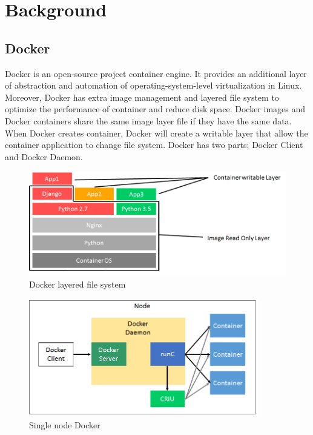 \chapter{Background}
\label{chap:background}
\section{Docker}
Docker is an open-source project container engine. It provides an additional layer of abstraction and automation of operating-system-level virtualization in Linux. Moreover, Docker has extra image management and layered file system to optimize the performance of container and reduce disk space. Docker images and Docker containers share the same image layer file if they have the same data. When Docker creates container, Docker will create a writable layer that allow the container application to change file system. Docker has two parts; Docker Client and Docker Daemon.

\begin{figure}[h]
\begin{center}
\includegraphics[width=15cm]{figure/layered_file_system.png}
\end{center}
\caption{Docker layered file system}
\label{fig:Docker layered file system}
\end{figure}

\begin{figure}[h]
\begin{center}
\includegraphics[width=10cm]{figure/single_node.png}
\end{center}
\caption{Single node Docker}
\end{figure}

